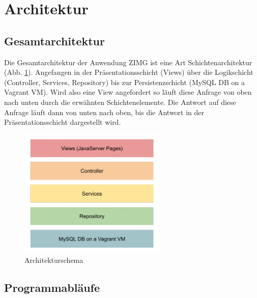 \documentclass[12pt, oneside, a4paper]{article}		%
\begin{document}
\section{Architektur}

\subsection{Gesamtarchitektur}

Die Gesamtarchitektur der Anwendung ZIMG ist eine Art Schichtenarchitektur (Abb. \ref{ArchitectureScheme}). Angefangen in der Präsentationsschicht (Views) über die Logikschicht (Controller, Services, Repository) bis zur Persistenzschicht (MySQL DB on a Vagrant VM). Wird also eine View angefordert so läuft diese Anfrage von oben nach unten durch die erwähnten Schichtenelemente. Die Antwort auf diese Anfrage läuft dann von unten nach oben, bis die Antwort in der Präsentationsschicht dargestellt wird.

\begin{figure}[H]
	\centering
	\includegraphics[width=7cm]{footage/ZIMG_ProjektArchitektur} 
	\caption{Architekturschema}
	\label{ArchitectureScheme}
\end{figure}

\subsection{Programmabläufe}
\end{document}
